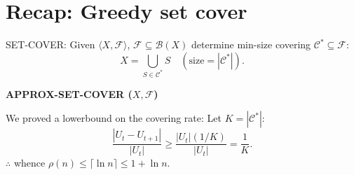 \section{Recap: Greedy set cover}
SET-COVER: Given $\langle X,\mathcal F\rangle$, $\mathcal F\subseteq\mathcal B(X)$ determine min-size covering $\mathcal C^*\subseteq\mathcal F$:
\[X=\bigcup_{S\in\mathcal C^*}S\quad(\text{size}=|\mathcal C^*|).\]
\begin{notesalgorithm}
\textbf{APPROX-SET-COVER ($X,\mathcal F$)}
\begin{notespseudocode}
\end{notespseudocode}
\end{notesalgorithm}
We proved a lowerbound on the covering rate: Let $K=|\mathcal C^*|$:
\[\frac{|U_t-U_{t+1}|}{|U_t|}\geq\frac{|U_t|(1/K)}{|U_t|}=\frac1K.\]
$\therefore$ whence $\rho(n)\leq\lceil\ln n\rceil\leq1+\ln n$.
